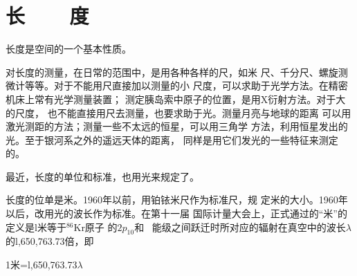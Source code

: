 \section[长度]{长~~~~度}\label{sec:01.03}

长度是空间的一个基本性质。

对长度的测量，在日常的范围中，是用各种各样的尺，如米
尺、千分尺、螺旋测微计等等。对于不能用尺直接加以测量的小
尺度，可以求助于光学方法。在精密机床上常有光学测量装置；
测定胰岛索中原子的位置，是用X衍射方法。对于大的尺度，
也不能直接用尺去测量，也要求助于光。测量月亮与地球的距离
可以用激光测距的方法；测量一些不太远的恒星，可以用三角学
方法，利用恒星发出的光。至于银河系之外的遥远天体的距离，
同样是用它们发光的一些特征来测定的。

最近，长度的单位和标准，也用光来规定了。

长度的位单是米。1960年以前，用铂铱米尺作为标准尺，规
定米的大小。1960年以后，改用光的波长作为标准。在第十一届
国际计量大会上，正式通过的“米”的定义是l米等于$^{86}$Kr原子
的$2p_{10}$和~
能级之间跃迁时所对应的辐射在真空中的波长$\lambda$的l,650,763.73倍，即

\centerline{1米=l,650,763.73$\lambda$}

